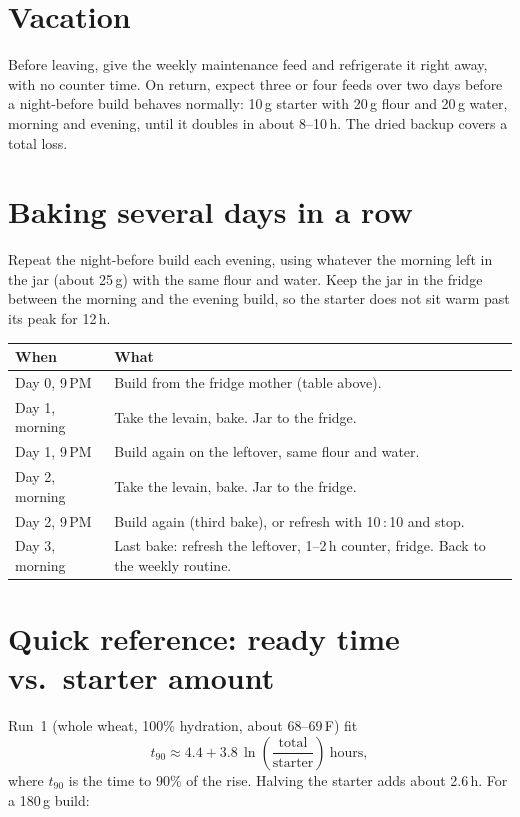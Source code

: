 \documentclass[11pt]{article}
\newcommand{\plTotal}{180}
\newcommand{\refF}{10}\newcommand{\refW}{10}
\newcommand{\buildTime}{9\,PM}
\begin{document}
\section*{Vacation}

Before leaving, give the weekly maintenance feed and refrigerate it right away, with
no counter time. On return, expect three or four feeds over two days before a
night-before build behaves normally: 10\,g starter with 20\,g flour and 20\,g water,
morning and evening, until it doubles in about 8--10\,h. The dried backup covers a
total loss.

\section*{Baking several days in a row}

Repeat the night-before build each evening, using whatever the morning left in the
jar (about 25\,g) with the same flour and water. Keep the jar in the fridge between
the morning and the evening build, so the starter does not sit warm past its peak
for 12\,h.

\begin{center}
\begin{tabularx}{\linewidth}{@{}lX@{}}
\toprule
When & What \\
\midrule
Day 0, \buildTime & Build from the fridge mother (table above). \\
Day 1, morning   & Take the levain, bake. Jar to the fridge. \\
Day 1, \buildTime & Build again on the leftover, same flour and water. \\
Day 2, morning   & Take the levain, bake. Jar to the fridge. \\
Day 2, \buildTime & Build again (third bake), or refresh with \refF\,:\,\refW{} and stop. \\
Day 3, morning   & Last bake: refresh the leftover, 1--2\,h counter, fridge. Back to the weekly routine. \\
\bottomrule
\end{tabularx}
\end{center}

\section*{Quick reference: ready time vs.\ starter amount}

Run~1 (whole wheat, 100\% hydration, about 68--69\,\textdegree F) fit
\[
  t_{90} \approx 4.4 + 3.8\,\ln\!\left(\frac{\text{total}}{\text{starter}}\right)\ \text{hours},
\]
where $t_{90}$ is the time to 90\% of the rise. Halving the starter adds about 2.6\,h.
For a \plTotal\,g build:
\end{document}
